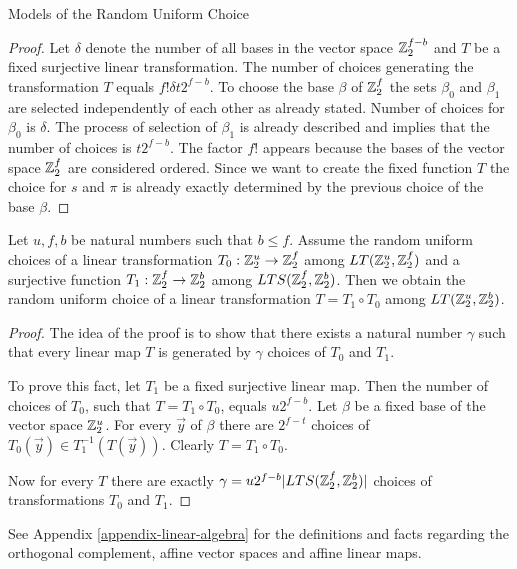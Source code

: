 \begin{section}{Models of the Random Uniform Choice}
\begin{proof}
Let $\delta$ denote the number of all bases in the vector space $\mathbb{Z}_{2}^{f - b}$ and $T$ be a fixed surjective linear transformation. The number of choices generating the transformation $T$ equals $f! \delta t 2 ^ {f - b}$. To choose the base $\beta$ of $\mathbb{Z}_{2}^{f}$ the sets $\beta_0$ and $\beta_1$ are selected independently of each other as already stated. Number of choices for $\beta_0$ is $\delta$. The process of selection of $\beta_1$ is already described and implies that the number of choices is $t 2 ^ {f - b}$. The factor $f!$ appears because the bases of the vector space $\mathbb{Z}_{2}^{f}$ are considered ordered. Since we want to create the fixed function $T$ the choice for $s$ and $\pi$ is already exactly determined by the previous choice of the base $\beta$. 
\end{proof}

\begin{remark}
\label{remark-model-uniform-linear-map-selection}
Let $u, f, b$ be natural numbers such that $b \leq f$. Assume the random uniform choices of a linear transformation $T_0: \mathbb{Z}_{2}^{u} \rightarrow \mathbb{Z}_{2}^{f}$ among $LT(\mathbb{Z}_{2}^{u}, \mathbb{Z}_{2}^{f})$ and a surjective function $T_1: \mathbb{Z}_{2}^{f} \rightarrow \mathbb{Z}_{2}^{b}$ among $LTS(\mathbb{Z}_{2}^{f}, \mathbb{Z}_{2}^{b})$. Then we obtain the random uniform choice of a linear transformation $T = T_1 \circ T_0$ among $LT(\mathbb{Z}_{2}^{u}, \mathbb{Z}_{2}^{b})$.
\end{remark}
\begin{proof}
The idea of the proof is to show that there exists a natural number $\gamma$ such that every linear map $T$ is generated by $\gamma$ choices of $T_0$ and $T_1$.

To prove this fact, let $T_1$ be a fixed surjective linear map. Then the number of choices of $T_0$, such that $T = T_1 \circ T_0$, equals $u 2 ^ {f - b}$. Let $\beta$ be a fixed base of the vector space $\mathbb{Z}_{2}^{u}$. For every $\vec{y}$ of $\beta$ there are $2 ^ {f - t}$ choices of $T_0(\vec{y}) \in T_1^{-1}(T(\vec{y}))$.  Clearly $T = T_1 \circ T_0$.

Now for every $T$ there are exactly $\gamma = u 2 ^ {f - b} |LTS(\mathbb{Z}_{2}^{f}, \mathbb{Z}_{2}^{b})|$ choices of transformations $T_0$ and $T_1$.
\end{proof}

See Appendix \ref{appendix-linear-algebra} for the definitions and facts regarding the orthogonal complement, affine vector spaces and affine linear maps. 


\end{section}
